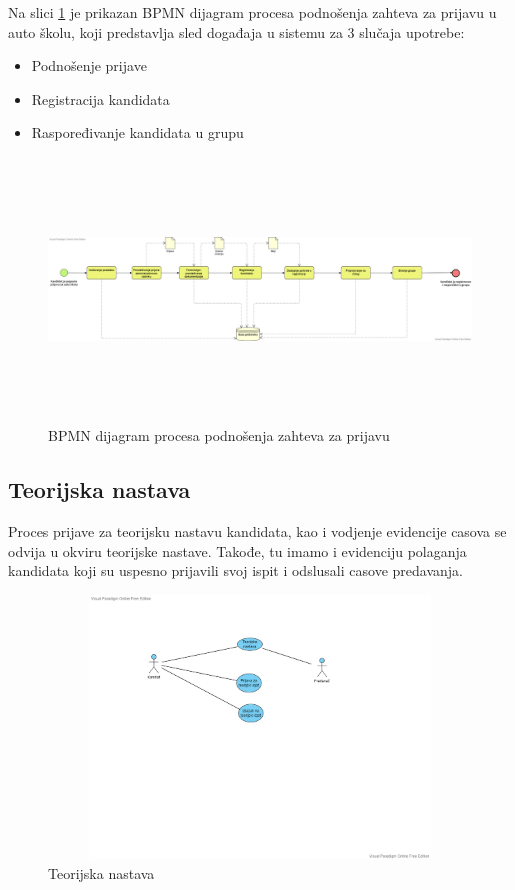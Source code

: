 Na slici \ref{fig:bpmn_podnosenje_zahteva} je prikazan BPMN dijagram procesa podnošenja zahteva za prijavu u auto školu,
koji predstavlja sled događaja u sistemu za 3 slučaja upotrebe:
\begin{itemize}
    \item Podnošenje prijave
    \item Registracija kandidata
    \item Raspoređivanje kandidata u grupu
\end{itemize}

\begin{figure}[H]
    \begin{center}
        \includegraphics[width=155mm, height = 70mm]{Diagrams/bpmn_podnosenje_zahteva.png}
    \end{center}
    \caption {BPMN dijagram procesa podnošenja zahteva za prijavu}
    \label{fig:bpmn_podnosenje_zahteva}

\end{figure}


\subsection {Teorijska nastava}
Proces prijave za teorijsku nastavu kandidata, kao i vodjenje evidencije casova se odvija u okviru teorijske nastave. Takođe, tu imamo i evidenciju polaganja kandidata koji su uspesno prijavili svoj ispit i odslusali casove predavanja.

\begin{figure}[H]
  \begin{center}
      \includegraphics[width=140mm, height=70mm]{Diagrams/diagram teorijska nastava.png}
  \end{center}
  \caption {Teorijska nastava}
  \label{theory}

\end{figure}

